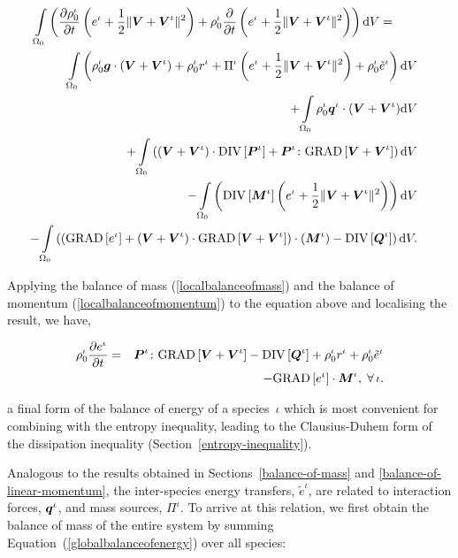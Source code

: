 \begin{eqnarray}
\int\limits_{\Omega_0}\left(\frac{\partial\rho_0^\iota}{\partial t}
\left(e^\iota + \frac{1}{2}\Vert\mbox{\boldmath$ V$}+\mbox{\boldmath$ V$}^\iota\Vert^2 \right) +
\rho^\iota_0\frac{\partial}{\partial t}\left(e^\iota +
\frac{1}{2}\Vert\mbox{\boldmath$ V$}+\mbox{\boldmath$ V$}^\iota\Vert^2 \right)\right) \mathrm{d}V
=\qquad & &\nonumber\\ \int\limits_{\Omega_0} \left(\rho_0^\iota\mbox{\boldmath$ g$}
\cdot\left(\mbox{\boldmath$ V$}+\mbox{\boldmath$ V$}^\iota\right) + \rho_0^\iota r^\iota +
\Pi^\iota\left(e^\iota + \frac{1}{2}\Vert\mbox{\boldmath$ V$}+\mbox{\boldmath$ V$}^\iota\Vert^2\right) +
\rho^\iota_0\tilde{e}^\iota\right)\mathrm{d}V& & \nonumber
\\ +\int\limits_{\Omega_0}\rho_0^\iota\mbox{\boldmath$ q$}^\iota\cdot(\mbox{\boldmath$ V$}+\mbox{\boldmath$ V$}^\iota)
\mathrm{d}V& &\nonumber\\ +\int\limits_{\Omega_0}
\left(\left(\mbox{\boldmath$ V$}+\mbox{\boldmath$ V$}^\iota\right)
\cdot\mathrm{DIV}\left[\mbox{\boldmath$ P$}^\iota\right] + \mbox{\boldmath$ P$}^\iota\colon\mathrm{GRAD}
\left[\mbox{\boldmath$ V$}+\mbox{\boldmath$ V$}^\iota\right]\right) \mathrm{d}V& &\nonumber\\ -
\int\limits_{\Omega_0}\left(\mathrm{DIV}\left[\mbox{\boldmath$ M$}^\iota\right]
\left(e^\iota +\frac{1}{2}
\Vert\mbox{\boldmath$ V$}+\mbox{\boldmath$ V$}^\iota\Vert^2\right)\right)\mathrm{d}V &
&\nonumber\\ -\int\limits_{\Omega_0}\left(
\left(\mathrm{GRAD}\left[e^\iota\right]+ \left(\mbox{\boldmath$ V$}+\mbox{\boldmath$ V$}^\iota\right)
\cdot \mathrm{GRAD}\left[\mbox{\boldmath$ V$}+\mbox{\boldmath$ V$}^\iota\right]\right)
\cdot\left(\mbox{\boldmath$ M$}^\iota\right) -
\mathrm{DIV}\left[\mbox{\boldmath$ Q$}^\iota\right]\right)\mathrm{d}V.\nonumber
\end{eqnarray}

\noindent Applying the balance of mass (\ref{localbalanceofmass}) and
the balance of momentum (\ref{localbalanceofmomentum}) to the equation
above and localising the result, we have,

\begin{eqnarray}
\rho^\iota_0\frac{\partial e^\iota}{\partial t} &=&
\mbox{\boldmath$ P$}^\iota\colon\mathrm{GRAD}\left[\mbox{\boldmath$ V$}+\mbox{\boldmath$ V$}^\iota\right]-
\mathrm{DIV}\left[\mbox{\boldmath$ Q$}^\iota\right] + \rho_0^\iota r^\iota
+\rho^\iota_0\tilde{e}^\iota\nonumber\\
& & - \mathrm{GRAD}\left[e^\iota\right]\cdot\mbox{\boldmath$ M$}^\iota,
\;\forall\,\iota.
\label{localbalanceofenergy}
\end{eqnarray}

\noindent a final form of the balance of energy of a species~$\iota$
which is most convenient for combining with the entropy inequality,
leading to the Clausius-Duhem form of the dissipation inequality
(Section~\ref{entropy-inequality}).

Analogous to the results obtained in Sections~\ref{balance-of-mass}
and \ref{balance-of-linear-momentum}, the inter-species energy
transfers, $\tilde{e}^{\iota}$, are related to interaction forces,
$\mbox{\boldmath$ q$}^{\iota}$, and mass sources, $\Pi^{\iota}$. To arrive at this
relation, we first obtain the balance of mass of the entire system by
summing Equation~(\ref{globalbalanceofenergy}) over all species:

